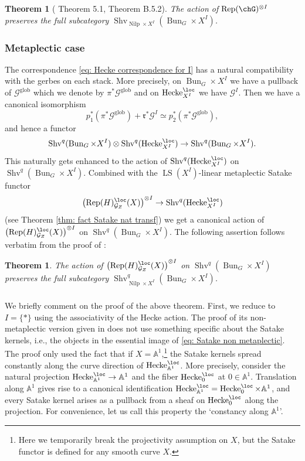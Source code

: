 \documentclass[10pt]{amsart}
\newcommand{\sssec}{\subsubsection}
\newtheorem{thm}[subsubsection]{Theorem}
\theoremstyle{remark}
\newcommand{\mf}[1]{\mathfrak{#1}}
\newcommand{\afl}{\mathbb{A}^1}
\newcommand{\on}{\operatorname}
\newcommand{\cG}{\mathcal{G}}
\newcommand{\Rep}{\on{Rep}}
\newcommand{\Shv}{\on{Shv}}
\newcommand{\Nilp}{\on{Nilp}}
\newcommand{\LS}{\on{LS}}
\newcommand{\Hecke}{\on{Hecke}}
\newcommand{\Bun}{\on{Bun}}
\begin{document}
\begin{thm}[\cite{NY} Theorem 5.1,\cite{GKRV} Theorem B.5.2]
The action of $\Rep(\chG)^{\otimes I}$ preserves the full subcategory $\Shv_{\Nilp\times X^I}(\Bun_G\times X^I)$.
\end{thm}


\sssec{Metaplectic case}\label{sssec: preservation metaplectic}
The correspondence \eqref{eq: Hecke correspondence for I} has a natural compatibility with the gerbes on each stack. More precisely, on $\Bun_G\times X^I$ we have a pullback of $\cG^{\on{glob}}$ which we denote by $\pi^*\cG^{\on{glob}}$ and on $\Hecke^{\loc}_{X^I}$ we have $\cG^I$. Then we have a canonical isomorphism
\[p_1^*(\pi^*\cG^{\on{glob}})+ \mf{r}^*\cG^I \simeq p^*_2(\pi^*\cG^{\on{glob}}),\]
and hence a functor
\[\Shv^q(\Bun_G\times X^I)\otimes \Shv^q(\Hecke^{\loc}_{X^I})\rightarrow \Shv^q(\Bun_G\times X^I).\]
This naturally gets enhanced to the action of $\Shv^q(\Hecke^{\loc}_{X^I})$ on $\Shv^q(\Bun_G\times X^I)$. Combined with the $\LS(X^I)$-linear metaplectic Satake functor
\[\left(\Rep(H)^{\loc}_{\cG_Z}(X)\right)^{\otimes I}\rightarrow \Shv^q(\Hecke^{\loc}_{X^I})\]
(see Theorem \ref{thm: fact Satake nat transf}) we get a canonical action of $\left(\Rep(H)^{\loc}_{\cG_Z}(X)\right)^{\otimes I}$ on $\Shv^q(\Bun_G\times X^I)$. The following assertion follows verbatim from the proof of \cite[Theorem B.5.2]{GKRV}:

\begin{thm}\label{thm: preservance Nilp metaplectic}
    The action of $\left(\Rep(H)^{\loc}_{\cG_Z}(X)\right)^{\otimes I}$ on $\Shv^q(\Bun_G\times X^I)$ preserves the full subcategory $\Shv^q_{\Nilp\times X^I}(\Bun_G\times X^I)$.
\end{thm}

\sssec{}
We briefly comment on the proof of the above theorem. First, we reduce to $I=\{*\}$ using the associativity of the Hecke action. The proof of its non-metaplectic version given in \cite{GKRV} does not use something specific about the Satake kernels, i.e., the objects in the essential image of \eqref{eq: Satake non metaplectic}. The proof only used the fact that if $X=\afl$,\footnote{Here we temporarily break the projectivity assumption on $X$, but the Satake functor is defined for any smooth curve $X$.} the Satake kernels spread constantly along the curve direction of $\Hecke^{\loc}_{\afl}$. More precisely, consider the natural projection $\Hecke^{\loc}_{\afl}\rightarrow \afl$ and the fiber $\Hecke^{\loc}_0$ at $0\in \afl$. Translation along $\afl$ gives rise to a canonical identification $\Hecke^{\loc}_{\afl}= \Hecke^{\loc}_0\times \afl$, and every Satake kernel arises as a pullback from a sheaf on $\Hecke^{\loc}_0$ along the projection. For convenience, let us call this property the `constancy along $\afl$'.
    \medskip
\end{document}
